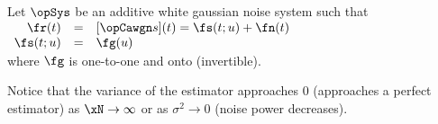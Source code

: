 \begin{theorem}
\label{thm:estML-CR}
Let $\opSys$ be an additive white gaussian noise system
such that
$\begin{array}[t]{rcl}
   \fr(t)     &=& [\opCawgn s](t) = \fs(t;u) + \fn(t) \\
   \fs(t;u)   &=& \fg( u )
\end{array}$\\
where $\fg$ is one-to-one and onto (invertible).
\\
\end{theorem}

Notice that the variance of the estimator approaches $0$
(approaches a perfect estimator) as $\xN\to\infty$
or as $\sigma^2\to 0$ (noise power decreases).


